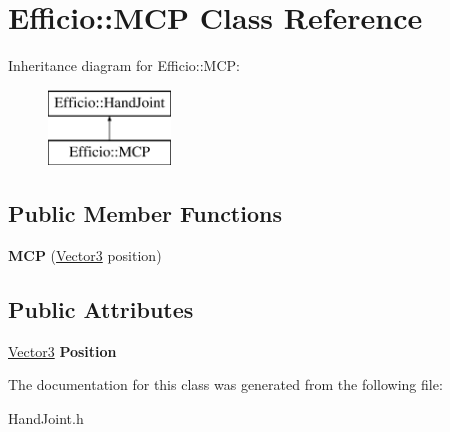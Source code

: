 \hypertarget{class_efficio_1_1_m_c_p}{}\section{Efficio\+:\+:M\+CP Class Reference}
\label{class_efficio_1_1_m_c_p}
Inheritance diagram for Efficio\+:\+:M\+CP\+:\begin{figure}[H]
\begin{center}
\leavevmode
\includegraphics[height=2.000000cm]{class_efficio_1_1_m_c_p}
\end{center}
\end{figure}
\subsection*{Public Member Functions}
\begin{DoxyCompactItemize}
\item 
\hypertarget{class_efficio_1_1_m_c_p_a3dd5a13b65af8dd001f540a1f2865d96}{}\label{class_efficio_1_1_m_c_p_a3dd5a13b65af8dd001f540a1f2865d96} 
{\bfseries M\+CP} (\hyperlink{class_efficio_1_1_vector3}{Vector3} position)
\end{DoxyCompactItemize}
\subsection*{Public Attributes}
\begin{DoxyCompactItemize}
\item 
\hypertarget{class_efficio_1_1_m_c_p_ad42b3365620505c0aebf885e9cecf8b5}{}\label{class_efficio_1_1_m_c_p_ad42b3365620505c0aebf885e9cecf8b5} 
\hyperlink{class_efficio_1_1_vector3}{Vector3} {\bfseries Position}
\end{DoxyCompactItemize}


The documentation for this class was generated from the following file\+:\begin{DoxyCompactItemize}
\item 
Hand\+Joint.\+h\end{DoxyCompactItemize}

